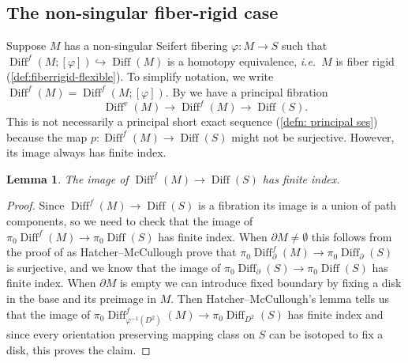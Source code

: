 \documentclass{amsart}
\theoremstyle{plain}
\newtheorem{lem}[thm]{Lemma}
\theoremstyle{definition}
\DeclareMathOperator\Diff{Diff}
\begin{document}
\subsection{The non-singular fiber-rigid case}\label{subsec:nonsingSF}
Suppose $M$ has a non-singular Seifert fibering $\varphi\colon M\rightarrow S$ such that $\Diff^f(M;[\varphi])\hookrightarrow \Diff(M)$ is a homotopy equivalence, \emph{i.e.}~$M$ is fiber rigid (\cref{def:fiberrigid-flexible}). To simplify notation, we write $\Diff^f(M)=\Diff^f(M;[\varphi])$.
By \cite[Corollary 3.1]{HKMR12} we have a principal fibration
\begin{equation}\label{eqn:fix fiber}
\Diff^v(M)\longrightarrow\Diff^f(M)\longrightarrow \Diff(S).
\end{equation}
This is not necessarily a principal short exact sequence (\cref{defn: principal ses}) because  the map $p\colon \Diff^f(M) \to \Diff(S)$ might not be surjective. 
However, its image always has finite index. 
\begin{lem}\label{lem:SF-finite-index}
    The image of $\Diff^f(M) \to \Diff(S)$ has finite index.
\end{lem}
\begin{proof}
    Since $\Diff^f(M) \to \Diff(S)$ is a fibration its image is a union of path components, so we need to check that the image of $\pi_0\Diff^f(M) \to \pi_0\Diff(S)$ has finite index.
    When $\partial M \neq \emptyset$ this follows from the proof of \cite[Lemma 2.2]{HatcherMcCullough} as Hatcher--McCullough prove that $\pi_0\Diff^f_\partial(M) \to \pi_0\Diff_\partial(S)$ is surjective, and we know that the image of $\pi_0 \Diff_\partial(S) \to \pi_0\Diff(S)$ has finite index.
    When $\partial M$ is empty we can introduce fixed boundary by fixing a disk in the base and its preimage in $M$.
    Then Hatcher--McCullough's lemma tells us that the image of 
    $\pi_0\Diff^f_{\varphi^{-1}(D^2)}(M) \to \pi_0\Diff_{D^2}(S)$ 
    has finite index and since every orientation preserving mapping class on $S$ can be isotoped to fix a disk, this proves the claim. 
\end{proof}
\end{document}
